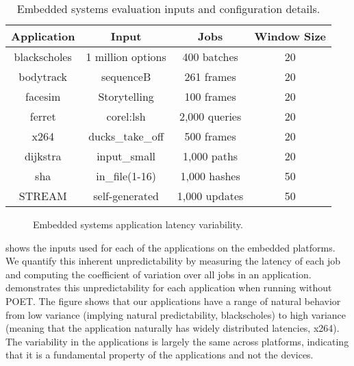 \begin{table}[t]
\small
\centering
\caption{Embedded systems evaluation inputs and configuration details.}
\begin{tabular}{cccc}
  \textbf{Application} & \textbf{Input} & \textbf{Jobs} & \textbf{Window Size} \\
  \hline
  \hline
  blackscholes   & 1 million options              & 400 batches   & 20 \\
  bodytrack      & sequenceB                      & 261 frames    & 20 \\
  facesim        & Storytelling                   & 100 frames    & 20 \\
  ferret         & corel:lsh                      & 2,000 queries & 20 \\
  x264           & ducks\_take\_off               & 500 frames    & 20 \\
  dijkstra       & input\_small                   & 1,000 paths   & 20 \\
  sha            & in\_file(1-16)                 & 1,000 hashes  & 50 \\
  STREAM         & self-generated                 & 1,000 updates & 50 \\
  \hline
  \hline
\end{tabular}
\label{tbl:poet-embedded-inputs}
\end{table}

\begin{figure}[t]
  \centering
  
  \caption{Embedded systems application latency variability.}
  \label{fig:poet-embedded-variation}
\end{figure}

 shows the inputs used for each of the applications on the embedded platforms.
We quantify this inherent unpredictability by measuring the latency of each job and computing the coefficient of variation over all jobs in an application.
 demonstrates this unpredictability for each application when running without POET.
The figure shows that our applications have a range of natural behavior from low variance (implying natural predictability, \eg blackscholes) to high variance (meaning that the application naturally has widely distributed latencies, \eg x264).
The variability in the applications is largely the same across platforms, indicating that it is a fundamental property of the applications and not the devices.

